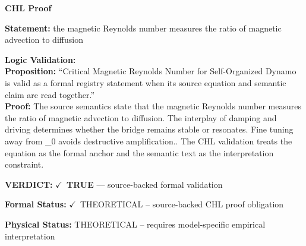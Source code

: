 \vspace{0.45em}
\noindent\textbf{CHL Proof}\par
\textbf{Statement:} the magnetic Reynolds number measures the ratio of magnetic advection to diffusion

\textbf{Logic Validation:}\\
\textbf{Proposition:} ``Critical Magnetic Reynolds Number for Self-Organized Dynamo is valid as a formal
registry statement when its source equation and semantic claim are read together.''\\
\textbf{Proof:} The source semantics state that the magnetic Reynolds number measures the ratio of
magnetic advection to diffusion. The interplay of damping and driving determines whether
the bridge remains stable or resonates. Fine tuning  away from \_0 avoids destructive
amplification.. The CHL validation treats the equation as the formal anchor and the
semantic text as the interpretation constraint.

\textbf{VERDICT:} \ensuremath{\checkmark}\ \textbf{TRUE} --- source-backed formal validation

\textbf{Formal Status:} \ensuremath{\checkmark}\ THEORETICAL -- source-backed CHL proof obligation

\textbf{Physical Status:} THEORETICAL -- requires model-specific empirical interpretation
\par\vspace{0.45em}
\par
\ifTZPDarkEdition
{}
\fi
\endgroup
\endgroup
